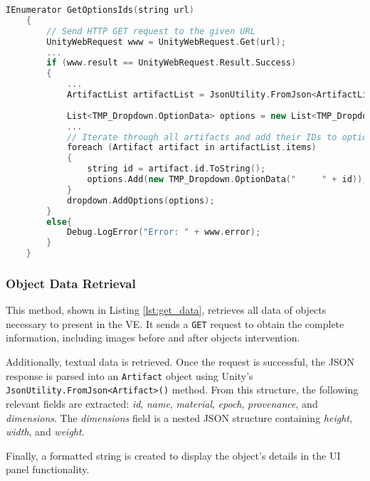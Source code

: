 \begin{lstlisting}[language=C++, caption={Method used to load artefact IDs and define as options in the Dropdown.}, label={lst:artifact_ids},float] 
      IEnumerator GetOptionsIds(string url)
    {
        // Send HTTP GET request to the given URL
        UnityWebRequest www = UnityWebRequest.Get(url);
        ...
        if (www.result == UnityWebRequest.Result.Success)
        {
            ...
            ArtifactList artifactList = JsonUtility.FromJson<ArtifactList>(wrappedJson);
            
            List<TMP_Dropdown.OptionData> options = new List<TMP_Dropdown.OptionData>();
            ...
            // Iterate through all artifacts and add their IDs to options List
            foreach (Artifact artifact in artifactList.items)
            {
                string id = artifact.id.ToString();
                options.Add(new TMP_Dropdown.OptionData("     " + id));
            }
            dropdown.AddOptions(options);
        }
        else{
            Debug.LogError("Error: " + www.error);
        }
    }
\end{lstlisting}


\subsubsection{Object Data Retrieval}
\label{sec:data_retrieval}
This method, shown in Listing \ref{lst:get_data}, retrieves all data of objects necessary to present in the \gls{VE}.  
It sends a \texttt{GET} request to obtain the complete information, including images before and after objects intervention.  

Additionally, textual data is retrieved. Once the request is successful, the JSON response is parsed into an \texttt{Artifact} object using Unity's \texttt{JsonUtility.FromJson<Artifact>()} method.  
From this structure, the following relevant fields are extracted: \emph{id}, \emph{name}, \emph{material}, \emph{epoch}, \emph{provenance}, and \emph{dimensions}.  
The \emph{dimensions} field is a nested JSON structure containing \emph{height}, \emph{width}, and \emph{weight}.  

Finally, a formatted string is created to display the object's details in the \gls{UI} panel functionality.


